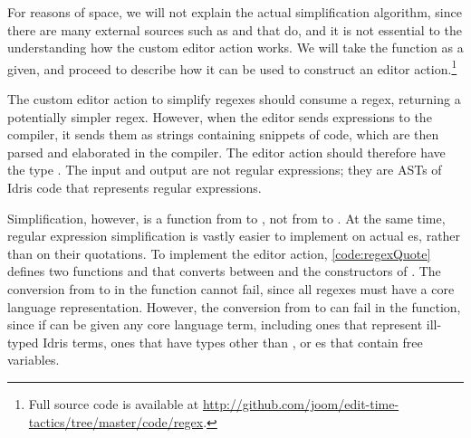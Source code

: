 For reasons of space, we will not explain the actual simplification algorithm, since there are
many external sources such as \citet{ortizRegex} and \citet{harperRegex}
 that do, and it is not essential to the understanding how the custom
editor action works.
We will take the function  as a
given, and proceed to describe how it can be used to construct an editor
action.\footnote{Full source code is available at
\url{http://github.com/joom/edit-time-tactics/tree/master/code/regex}.}

The custom editor action to simplify regexes should consume a regex, returning a
potentially simpler regex. However, when the editor sends expressions to the compiler,
it sends them as strings containing snippets of code, which are then parsed and
elaborated in the compiler.  The editor action should therefore have the type
\mt{\TT{} -> \Elab{} \TT{}}. The input and output are not regular expressions;
they are ASTs of Idris code that represents regular expressions.

Simplification, however, is a function from  to , not from
 to .
At the same time, regular expression simplification is vastly easier to implement
on actual es, rather than on their quotations.
To implement the editor action, \autoref{code:regexQuote} defines two functions  and 
that converts between \TT{} and the constructors of . The
conversion from  to  in the  function cannot fail,
since all regexes must have a core language representation. However, the
conversion from \TT{} to  can fail in the  function,
since if  can be given any core language term, including ones that
represent ill-typed Idris terms, ones that have types other than , or es
that contain free variables.

